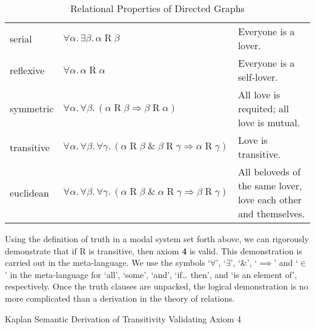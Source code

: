 \documentclass[
  12pt,
  letterpaper,
  DIV=11,
  numbers=noendperiod,
  twoside]{scrreprt}
\theoremstyle{remark}
\begin{document}
\begin{longtable}[]{@{}
  >{\raggedright\arraybackslash}p{}
  >{\raggedright\arraybackslash}p{}
  >{\raggedright\arraybackslash}p{}@{}}
\caption{Relational Properties of Directed
Graphs}\label{tbl-relational-properties-of-directed-graphs}\tabularnewline
\toprule\noalign{}
\endfirsthead
\endhead
\bottomrule\noalign{}
\endlastfoot
serial & \(\forall \alpha.\,\exists \beta.\, \alpha \mathbin{R} \beta\)
& Everyone is a lover. \\
reflexive & \(\forall \alpha.\,\alpha \mathbin{R} \alpha\) & Everyone is
a self-lover. \\
symmetric &
\(\forall \alpha.\, \forall \beta.\, (\alpha \mathbin{R} \beta \Rightarrow \beta \mathbin{R} \alpha)\)
& All love is requited; all love is mutual. \\
transitive &
\(\forall \alpha.\, \forall \beta .\, \forall \gamma.\, (\alpha \mathbin{R} \beta \;\&\; \beta \mathbin{R} \gamma \Rightarrow \alpha \mathbin{R} \gamma)\)
& Love is transitive. \\
euclidean &
\(\forall \alpha.\, \forall \beta.\, \forall \gamma.\, (\alpha \mathbin{R} \beta \;\&\; \alpha \mathbin{R} \gamma \Rightarrow \beta \mathbin{R} \gamma)\)
& All beloveds of the same lover, love each other and themselves. \\
\end{longtable}

Using the definition of truth in a modal system set forth above, we can
rigorously demonstrate that if R is transitive, then axiom \textbf{4} is
valid. This demonstration is carried out in the meta-language. We use
the symbols `\(\forall\)', `\(\exists\)', `\(\&\)', `\(\implies\)' and
`\(\in\)' in the meta-language for `all', `some', `and', `if\ldots{}
then', and `is an element of', respectively. Once the truth clauses are
unpacked, the logical demonstration is no more complicated than a
derivation in the theory of relations.

\phantom{a}

\begin{codelisting}

\caption{\label{lst-kaplan-transitivity-implies-validity-of-axiom-4}Kaplan
Semantic Derivation of Transitivity Validating Axiom 4}


\end{codelisting}%
\end{document}
